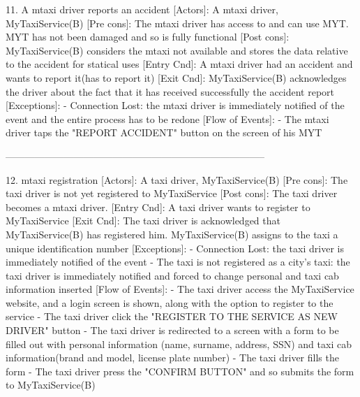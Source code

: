 \documentclass[11pt]{article} %
\begin{document}
      11. A mtaxi driver reports an accident
        [Actors]: A mtaxi driver, MyTaxiService(B)
        [Pre cons]: The mtaxi driver has access to and can use MYT. MYT has not been damaged and so
        is fully functional
        [Post cons]: MyTaxiService(B) considers the mtaxi not available and stores the data
        relative to the accident for statical uses
        [Entry Cnd]: A mtaxi driver had an accident and wants to report it(has to report it)
        [Exit Cnd]: MyTaxiService(B) acknowledges the driver about the fact that it has received
        successfully the accident report
        [Exceptions]:
          - Connection Lost: the mtaxi driver is immediately notified of the event and the entire process has to be redone
        [Flow of Events]:
          - The mtaxi driver taps the "REPORT ACCIDENT" button on the screen of his MYT

      --------------------------------------------------------------------------------

      12. mtaxi registration
        [Actors]: A taxi driver, MyTaxiService(B)
        [Pre cons]: The taxi driver is not yet registered to MyTaxiService
        [Post cons]: The taxi driver becomes a mtaxi driver.
        [Entry Cnd]: A taxi driver wants to register to MyTaxiService
        [Exit Cnd]: The taxi driver is acknowledged that MyTaxiService(B) has registered him. MyTaxiService(B)
        assigns to the taxi a unique identification number
        [Exceptions]:
          - Connection Lost: the taxi driver is immediately notified of the event
          - The taxi is not registered as a city's taxi: the taxi driver is immediately notified
          and forced to change personal and taxi cab information inserted
        [Flow of Events]:
          - The taxi driver access the MyTaxiService website, and a login
            screen is shown, along with the option to register to the service
          - The taxi driver click the "REGISTER TO THE SERVICE AS NEW DRIVER" button
          - The taxi driver is redirected to a screen with a form to be filled out with personal information (name, surname, address, SSN) and
           taxi cab information(brand and model, license plate number)
          - The taxi driver fills the form
          - The taxi driver press the "CONFIRM BUTTON" and so submits the form to MyTaxiService(B)
\end{document}
